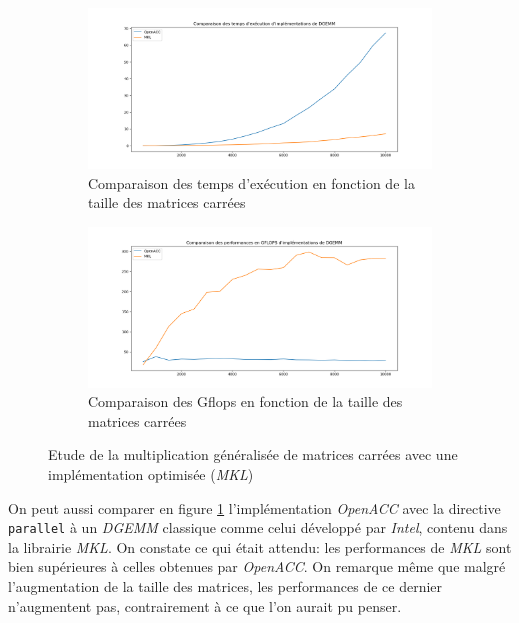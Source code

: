 \documentclass{article}
\begin{document}
\begin{figure}[!htb]

	\begin{subfigure}{\textwidth}
		\centering
		\includegraphics[width=\linewidth]{Time_OACC_MKL.png}
		\caption{Comparaison des temps d'exécution en fonction de la taille des matrices carrées}
	\end{subfigure}

	\begin{subfigure}{\textwidth}
		\centering
		\includegraphics[width=\linewidth]{Flops_OACC_MKL.png}
		\caption{Comparaison des G\gls{flops} en fonction de la taille des matrices carrées}
	\end{subfigure}
	\caption{Etude de la multiplication généralisée de matrices carrées avec une implémentation optimisée (\textit{MKL})}
	\label{fig:dgemm_acc_mkl}
\end{figure}

On peut aussi comparer en figure \ref{fig:dgemm_acc_mkl} l'implémentation \textit{OpenACC} avec la directive \texttt{parallel} à un \textit{DGEMM} classique comme celui développé par \textit{Intel}, contenu dans la librairie \textit{MKL}. On constate ce qui était attendu: les performances de \textit{MKL} sont bien supérieures à celles obtenues par \textit{OpenACC}. On remarque même que malgré l'augmentation de la taille des matrices, les performances de ce dernier n'augmentent pas, contrairement à ce que l'on aurait pu penser.
\end{document}
